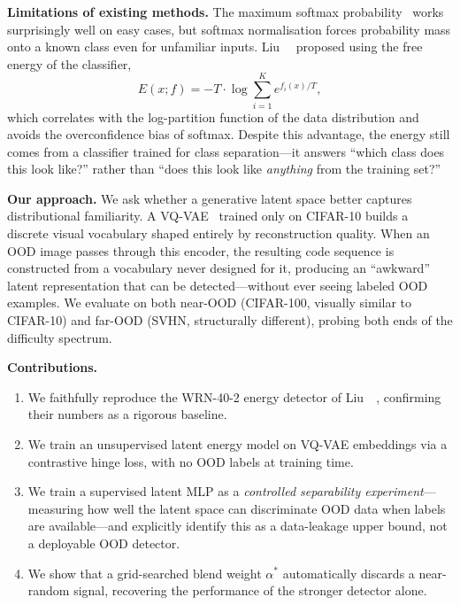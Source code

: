 \documentclass[10pt,twocolumn,letterpaper]{article}
\begin{document}
\textbf{Limitations of existing methods.}
The maximum softmax probability~\cite{hendrycks2017} works
surprisingly well on easy cases, but softmax normalisation
forces probability mass onto a known class even for
unfamiliar inputs.
Liu~\etal~\cite{liu2020} proposed using the free energy of
the classifier,
\begin{equation}
  E(x;f) = -T\cdot\log\!\sum_{i=1}^{K} e^{f_i(x)/T},
  \label{eq:energy}
\end{equation}
which correlates with the log-partition function of the
data distribution and avoids the overconfidence bias of
softmax.
Despite this advantage, the energy still comes from a
classifier trained for class separation---it answers
``which class does this look like?'' rather than ``does
this look like \emph{anything} from the training set?''

\textbf{Our approach.}
We ask whether a generative latent space better captures
distributional familiarity.
A VQ-VAE~\cite{vqvae2017} trained only on CIFAR-10 builds
a discrete visual vocabulary shaped entirely by
reconstruction quality.
When an OOD image passes through this encoder, the
resulting code sequence is constructed from a vocabulary
never designed for it, producing an ``awkward'' latent
representation that can be detected---without ever seeing
labeled OOD examples.
We evaluate on both near-OOD (CIFAR-100, visually similar
to CIFAR-10) and far-OOD (SVHN, structurally different),
probing both ends of the difficulty spectrum.

\textbf{Contributions.}
\begin{enumerate}\setlength\itemsep{0pt}
  \item We faithfully reproduce the WRN-40-2 energy
        detector of Liu~\etal~\cite{liu2020}, confirming
        their numbers as a rigorous baseline.
  \item We train an unsupervised latent energy model on
        VQ-VAE embeddings via a contrastive hinge loss,
        with no OOD labels at training time.
  \item We train a supervised latent MLP as a
        \emph{controlled separability experiment}---measuring
        how well the latent space can discriminate OOD data
        when labels are available---and explicitly identify
        this as a data-leakage upper bound, not a deployable
        OOD detector.
  \item We show that a grid-searched blend weight
        $\alpha^*$ automatically discards a near-random
        signal, recovering the performance of the stronger
        detector alone.
\end{enumerate}
\end{document}

